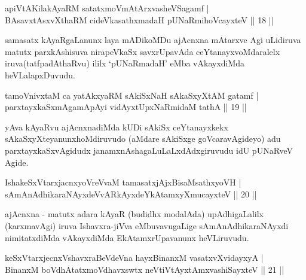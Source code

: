 
\begin{shl}
apiVtAKilakAyaRM satatxmoVmAtArxvasheVSagamf  | \\
BAsavxtAsxvXthaRM cideVkasathxmadaH pUNaRmihoVcayxteV \hfill||  18 ||  
\end{shl}

\begin{artha}
samasatx kAyaRgaLanunx laya mADikoMDu ajAcnxna mAtarxve Agi uLidiruva matutx parxkAshisuva nirapeVkaSx savxrUpavAda ceYtanayxvoMdaralelx iruva\break (tatfpadAthaRvu) ililx `pUNaRmadaH' eMba vAkayxdiMda heVLalapxDuvudu.
\end{artha}


\begin{shl}
tamoVnivxtaM ca yatAkxyaRM sAkiSxNaH sAkaSxyXtAM gatamf  | \\
parxtayxkaSxmAgamApAyi vidAyxtUpxNaRmidaM tathA \hfill||  19 ||  
\end{shl}

\begin{artha}
yAva kAyaRvu ajAcnxnadiMda kUDi sAkiSx ceYtanayxkekx sAkaSxyXteyanunx\break hoMdiruvudo (aMdare sAkiSxge goVcaravAgideyo) adu parxtayxkaSxvAgidudx janamxnAshagaLuLaLxdAdxgiruvudu idU pUNaRveV Agide.
\end{artha}

\begin{shl}
IshakeSxVtarxjacnxyoVreVvaM tamasatxjAjxBisaMsathxyoVH  | \\
sAmAnAdhikaraNAyxdeVvARkAyxdeYkAtamxyXmucayxteV \hfill||  20 ||  
\end{shl}

\begin{artha}
ajAcnxna - matutx adara kAyaR (budidhx modalAda) upAdhigaLalilx (karxmavAgi) iruva Ishavxra-jiVva eMbuvavugaLige sAmAnAdhikaraNAyxdi nimitatxdiMda vAkayxdiMda EkAtamxrUpavanunx heVLiruvudu.
\end{artha}


\begin{shl}
keSxVtarxjecnxVshavxraBeVdeVna hayxBinanxM vasatxvXvidayxyA  | \\
BinanxM boVdhAtatxmoVdhavxswtx neVtiVtAyxtAmx\s vashiSayxteV \hfill||  21 || 
\end{shl}

